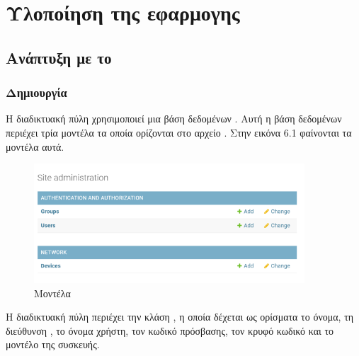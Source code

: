 \chapter{Υλοποίηση της εφαρμογης}

\section{Ανάπτυξη με το  }

\subsection{Δημιουργία }

Η διαδικτυακή πύλη χρησιμοποιεί μια βάση δεδομένων . Αυτή η βάση δεδομένων περιέχει τρία
μοντέλα τα οποία ορίζονται στο αρχείο . Στην εικόνα 6.1 φαίνονται τα μοντέλα αυτά.

\FloatBarrier

\begin{figure}[htb]
	\centering
	\includegraphics[width=0.9\textwidth]{graphics/models_2.png}
	\caption{Μοντέλα}
\end{figure}

\FloatBarrier


Η διαδικτυακή πύλη περιέχει την κλάση , η οποία δέχεται ως ορίσματα το όνομα, τη διεύθυνση , το όνομα χρήστη, τον κωδικό πρόσβασης, τον κρυφό κωδικό και το μοντέλο της συσκευής.

